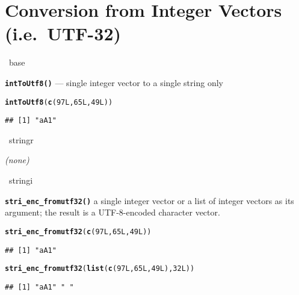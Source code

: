 \documentclass[11pt]{article}\usepackage[]{graphicx}\usepackage[]{color}
\makeatletter
\newcommand{\hlnum}[1]{\textcolor[rgb]{0.686,0.059,0.569}{#1}}%
\newcommand{\hlstd}[1]{\textcolor[rgb]{0.345,0.345,0.345}{#1}}%
\newcommand{\hlkwd}[1]{\textcolor[rgb]{0.737,0.353,0.396}{\textbf{#1}}}%
\newenvironment{kframe}{%
 \def\at@end@of@kframe{}%
 \ifinner\ifhmode%
  \def\at@end@of@kframe{\end{minipage}}%
  \begin{minipage}{\columnwidth}%
 \fi\fi%
 \def\FrameCommand##1{\hskip\@totalleftmargin \hskip-\fboxsep
 \colorbox{shadecolor}{##1}\hskip-\fboxsep
     \hskip-\linewidth \hskip-\@totalleftmargin \hskip\columnwidth}%
 \MakeFramed {\advance\hsize-\width
   \@totalleftmargin\z@ \linewidth\hsize
   \@setminipage}}%
 {\par\unskip\endMakeFramed%
 \at@end@of@kframe}
\newenvironment{knitrout}{}{} %
\newcommand{\package}[1]{\textsf{#1}\xspace}
\newcommand{\func}[1]{\texttt{\hlkwd{#1}}}
\newcommand{\ColumnOne}{\begin{minipage}[t]{0.32\textwidth}
   \hrulefill~\package{base}~\hrulefill

   \medskip}
\newcommand{\ColumnTwo}{\vfill\end{minipage}\hspace*{0.02\textwidth}%
\begin{minipage}[t]{0.32\textwidth}
   \hrulefill~\package{stringr}~\hrulefill

   \medskip}
\newcommand{\ColumnThree}{\vfill\end{minipage}\hspace*{0.02\textwidth}%
\begin{minipage}[t]{0.32\textwidth}
   \hrulefill~\package{stringi}~\hrulefill

   \medskip}
\newcommand{\ColumnEnd}{\vfill\end{minipage}}
\makeatother
\begin{document}
\clearpage

\section{Conversion from Integer Vectors (i.e.~UTF-32)}


\ColumnOne
   \func{intToUtf8()} --- single integer vector to a single string only

\begin{knitrout}\small
{}\color{fgcolor}\begin{kframe}
\begin{alltt}
\hlkwd{intToUtf8}\hlstd{(}\hlkwd{c}\hlstd{(}\hlnum{97L}\hlstd{,} \hlnum{65L}\hlstd{,} \hlnum{49L}\hlstd{))}
\end{alltt}
\begin{verbatim}
## [1] "aA1"
\end{verbatim}
\end{kframe}
\end{knitrout}

\ColumnTwo

\textit{(none)}

\ColumnThree
   \func{stri\_enc\_fromutf32()} a single integer vector
   or a list of integer vectors as its argument;
   the result is a UTF-8-encoded character vector.

\begin{knitrout}\small
{}\color{fgcolor}\begin{kframe}
\begin{alltt}
\hlkwd{stri_enc_fromutf32}\hlstd{(}\hlkwd{c}\hlstd{(}\hlnum{97L}\hlstd{,} \hlnum{65L}\hlstd{,} \hlnum{49L}\hlstd{))}
\end{alltt}
\begin{verbatim}
## [1] "aA1"
\end{verbatim}
\begin{alltt}
\hlkwd{stri_enc_fromutf32}\hlstd{(}\hlkwd{list}\hlstd{(}\hlkwd{c}\hlstd{(}\hlnum{97L}\hlstd{,} \hlnum{65L}\hlstd{,} \hlnum{49L}\hlstd{),} \hlnum{32L}\hlstd{))}
\end{alltt}
\begin{verbatim}
## [1] "aA1" " "
\end{verbatim}
\end{kframe}
\end{knitrout}


\ColumnEnd
\end{document}

